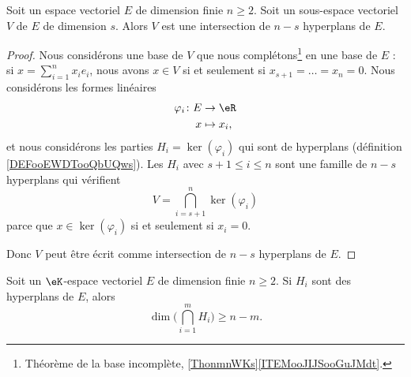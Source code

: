 \begin{proposition}
	Soit un espace vectoriel \( E\) de dimension finie \( n\geq 2\). Soit un sous-espace vectoriel \( V\) de \( E\) de dimension \( s\). Alors \( V\) est une intersection de \( n-s\) hyperplans de \( E\).
\end{proposition}

\begin{proof}
	Nous considérons une base de \( V\) que nous complétons\footnote{Théorème de la base incomplète, \ref{ThonmnWKs}\ref{ITEMooJIJSooGuJMdt}.} en une base de \( E\) : si \( x=\sum_{i=1}^nx_ie_i\), nous avons \( x\in V\) si et seulement si \( x_{s+1}=\ldots=x_n=0\). Nous considérons les formes linéaires
	\begin{equation}
		\begin{aligned}
			\varphi_i\colon E & \to \eR      \\
			x                 & \mapsto x_i,
		\end{aligned}
	\end{equation}
	et nous considérons les parties \( H_i=\ker(\varphi_i)\) qui sont de hyperplans (définition \ref{DEFooEWDTooQbUQws}). Les \( H_i\) avec \( s+1\leq i\leq n\) sont une famille de \( n-s\) hyperplans qui vérifient
	\begin{equation}
		V=\bigcap_{i=s+1}^n\ker(\varphi_i)
	\end{equation}
	parce que \( x\in \ker(\varphi_i)\) si et seulement si \( x_i=0\).

	Donc \( V\) peut être écrit comme intersection de \( n-s\) hyperplans de \( E\).
\end{proof}

\begin{proposition}      \label{PROPooRCLNooJpIMMl}
	Soit un \( \eK\)-espace vectoriel \( E\) de dimension finie \( n\geq 2\). Si \( H_i\) sont des hyperplans de \( E\), alors
	\begin{equation}
		\dim\Big( \bigcap_{i=1}^mH_i \Big)\geq n-m.
	\end{equation}
\end{proposition}

